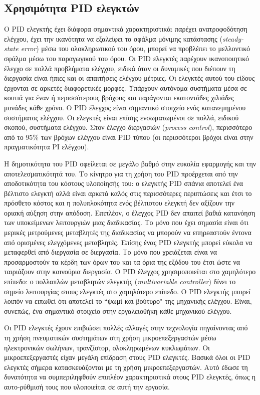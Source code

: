 \subsection{Χρησιμότητα PID ελεγκτών}

Ο PID ελεγκτής έχει διάφορα σημαντικά χαρακτηριστικά: παρέχει ανατροφοδότηση ελέγχου, έχει την ικανότητα να εξαλείφει το σφάλμα μόνιμης κατάστασης (\emph{steady-state error}) μέσω του ολοκληρωτικού του όρου, μπορεί να προβλέπει το μελλοντικό σφάλμα μέσω του παραγωγικού του όρου. Οι PID ελεγκτές παρέχουν ικανοποιητικό έλεγχο σε πολλά προβλήματα ελέγχου, ειδικά όταν οι δυναμικές που διέπουν τη διεργασία είναι ήπιες και οι απαιτήσεις ελέγχου μέτριες. Οι ελεγκτές αυτού του είδους έρχονται σε αρκετές διαφορετικές μορφές. Υπάρχουν αυτόνομα συστήματα μέσα σε κουτιά για έναν ή περισσότερους βρόχους και παράγονται εκατοντάδες χιλιάδες μονάδες κάθε χρόνο. Ο PID έλεγχος είναι σημαντικό στοιχείο ενός κατανεμημένου συστήματος ελέγχου. Οι ελεγκτές είναι επίσης ενσωματωμένοι σε πολλά, ειδικού σκοπού, συστήματα ελέγχου. Στον έλεγχο διεργασιών (\emph{process control}), περισσότερο από το $95\%$ των βρόχων ελέγχου είναι PID τύπου (οι περισσότεροι βρόχοι είναι στην πραγματικότητα PI ελέγχου).

Η δημοτικότητα του PID οφείλεται σε μεγάλο βαθμό στην ευκολία εφαρμογής και την αποτελεσματικότητά του. Το κίνητρο για τη χρήση του PID προέρχεται από την αποδοτικότητα του κόστους υλοποίησής του: ο ελεγκτής PID σπάνια αποτελεί ένα βέλτιστο ελεγκτή αλλά είναι αρκετά καλός στις περισσότερες περιπτώσεις και έτσι το πρόσθετο κόστος και η πολυπλοκότητα ενός βέλτιστου ελεγκτή δεν αξίζουν την οριακή αύξηση στην απόδοση. Επιπλέον, ο έλεγχος PID δεν απαιτεί βαθιά κατανόηση των υποκείμενων λειτουργιών μιας διαδικασίας. Το μόνο που έχει σημασία είναι ότι μερικές μετρούμενες μεταβλητές της διαδικασίας να μπορούν να επηρεαστούν έντονα από ορισμένες ελεγχόμενες μεταβλητές. Επίσης ένας PID ελεγκτής μπορεί εύκολα να μεταφερθεί από διεργασία σε διεργασία. Το μόνο που χρειάζεται είναι να προσαρμοστούν τα κέρδη των όρων του και τα όρια της εξόδου του έτσι ώστε να ταιριάζουν στην καινούρια διεργασία. Ο PID έλεγχος χρησιμοποιείται στο χαμηλότερο επίπεδο: ο πολλαπλών μεταβλητών ελεγκτής (\emph{multivariable controller}) δίνει το σημείο λειτουργίας στους ελεγκτές στο χαμηλότερο επίπεδο. Ο PID ελεγκτής μπορεί λοιπόν να ειπωθεί ότι αποτελεί το ``ψωμί και βούτυρο" της μηχανικής ελέγχου. Είναι, συνεπώς, ένα σημαντικό στοιχείο στην εργαλειοθήκη κάθε μηχανικού ελέγχου. 

Οι PID ελεγκτές έχουν επιβιώσει πολλές αλλαγές στην τεχνολογία πηγαίνοντας από τη χρήση πνευματικών συστημάτων στη χρήση μικροεπεξεργαστών μέσω ηλεκτρονικών σωλήνων, τρανζίστορ, ολοκληρωμένων κυκλωμάτων. Οι μικροεπεξεργαστές είχαν μεγάλη επίδραση στους PID ελεγκτές. Βασικά όλοι οι PID ελεγκτές σήμερα κατασκευάζονται με τη χρήση μικροεπεξεργαστών. Αυτό έδωσε τη δυνατότητα να συμπεριληφθούν επιπλέον χαρακτηριστικά στους PID ελεγκτές, όπως η αυτο-ρύθμισή τους που υλοποιείται σε αυτή την εργασία.

